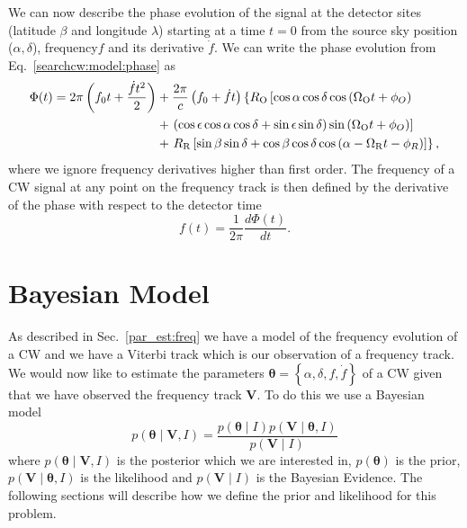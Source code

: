 We can now describe the phase evolution of the signal at the detector
sites (latitude $\beta$ and longitude $\lambda$) starting at a time $t=0$ from the source sky
position ($\alpha, \delta$), frequency$f$ and its derivative
$\dot{f}$.  We can write the phase evolution from Eq.~\ref{searchcw:model:phase} as
%
\begin{equation}
    \label{par_est:freq:ph_evolution}
    \begin{split}
        \Phi(t) = 2\pi \left(  f_0 t + \frac{\dot{f} t^2}{2} \right) &+ \frac{2\pi}{c} \left(  f_0 + \dot{f}t  \right) \left\{ R_{\rm{O}} \left[ \cos \alpha \cos \delta \cos \left( \Omega_{\mathrm{O}} t + \phi_{O}  \right) \right. \right. \\ 
        &+ \left. \left( \cos \epsilon \cos \alpha \cos \delta +  \sin \epsilon \sin \delta \right) \sin \left( \Omega_{\mathrm{O}} t + \phi_{O}  \right) \right] \\
        &+ \left. R_{\rm{R}} \left[ \sin \beta \sin \delta + \cos \beta \cos \delta \cos \left( \alpha - \Omega_{\mathrm{R}} t - \phi_{R}  \right)     \right] \right\},
    \end{split}
\end{equation}
%
where we ignore frequency derivatives higher than first order.
The frequency of a \gls{CW} signal at any point on the frequency track is then defined by the derivative of
the phase with respect to the detector time
%
\begin{equation}
f(t) = \frac{1}{2\pi}\frac{d\Phi(t)}{dt}.
\end{equation}

%
%
\section{\label{par_est:bayes}Bayesian Model}
%
%

As described in Sec.~\ref{par_est:freq} we have a model of the frequency
evolution of a \gls{CW} and we have a Viterbi track which is our observation of
a frequency track.  We would now like to estimate the parameters $\bm{\theta} =
\left\{\alpha, \delta, f, \dot{f} \right\}$ of a \gls{CW} given that we have
observed the frequency track $\bm{V}$.  To do this we use a Bayesian model
%
\begin{equation}
    \label{par_est:bayes:eqn}
    p(\bm{\theta} \mid \bm{V}, I) = \frac{p(\bm{\theta} \mid I) p(\bm{V} \mid \bm{\theta}, I)}{p(\bm{V} \mid I)}
\end{equation}
%
where $p(\bm{\theta} \mid \bm{V}, I)$ is the posterior which we are interested in,
$p(\bm{\theta})$ is the prior, $p(\bm{V} \mid \bm{\theta}, I)$ is the
likelihood and $p(\bm{V} \mid I)$ is the Bayesian Evidence. The
following sections will describe how we define the prior and likelihood for
this problem.

